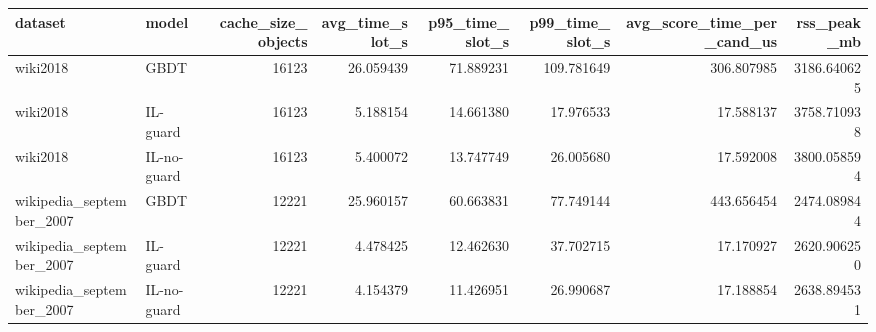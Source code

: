 \begin{tabular}{llrrrrrr}
\toprule
                 dataset &       model &  cache\_size\_objects &  avg\_time\_slot\_s &  p95\_time\_slot\_s &  p99\_time\_slot\_s &  avg\_score\_time\_per\_cand\_us &  rss\_peak\_mb \\
\midrule
                wiki2018 &        GBDT &               16123 &        26.059439 &        71.889231 &       109.781649 &                  306.807985 &  3186.640625 \\
                wiki2018 &    IL-guard &               16123 &         5.188154 &        14.661380 &        17.976533 &                   17.588137 &  3758.710938 \\
                wiki2018 & IL-no-guard &               16123 &         5.400072 &        13.747749 &        26.005680 &                   17.592008 &  3800.058594 \\
wikipedia\_september\_2007 &        GBDT &               12221 &        25.960157 &        60.663831 &        77.749144 &                  443.656454 &  2474.089844 \\
wikipedia\_september\_2007 &    IL-guard &               12221 &         4.478425 &        12.462630 &        37.702715 &                   17.170927 &  2620.906250 \\
wikipedia\_september\_2007 & IL-no-guard &               12221 &         4.154379 &        11.426951 &        26.990687 &                   17.188854 &  2638.894531 \\
\bottomrule
\end{tabular}
